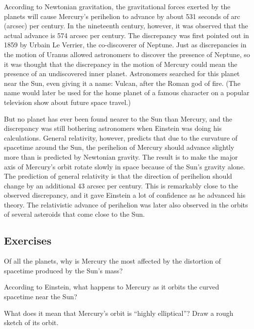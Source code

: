 \documentclass{article}
\numberwithin{equation}{section}
\numberwithin{figure}{section}
\begin{document}
According to Newtonian gravitation, the gravitational forces exerted by the planets will cause Mercury's perihelion to advance by about 531 seconds of arc (arcsec) per century. In the nineteenth century, however, it was observed that the actual advance is 574 arcsec per century. The discrepancy was first pointed out in 1859 by Urbain Le Verrier, the co-discoverer of Neptune. Just as discrepancies in the motion of Uranus allowed astronomers to discover the presence of Neptune, so it was thought that the discrepancy in the motion of Mercury could mean the presence of an undiscovered inner planet. Astronomers searched for this planet near the Sun, even giving it a name: Vulcan, after the Roman god of fire. (The name would later be used for the home planet of a famous character on a popular television show about future space travel.)
\vspace{1em}

But no planet has ever been found nearer to the Sun than Mercury, and the discrepancy was still bothering astronomers when Einstein was doing his calculations. General relativity, however, predicts that due to the curvature of spacetime around the Sun, the perihelion of Mercury should advance slightly more than is predicted by Newtonian gravity. The result is to make the major axis of Mercury's orbit rotate slowly in space because of the Sun's gravity alone. The prediction of general relativity is that the direction of perihelion should change by an additional 43 arcsec per century. This is remarkably close to the observed discrepancy, and it gave Einstein a lot of confidence as he advanced his theory. The relativistic advance of perihelion was later also observed in the orbits of several asteroids that come close to the Sun.

\subsection*{Exercises}

\begin{exercise}
    Of all the planets, why is Mercury the most affected by the distortion of spacetime produced by the Sun's mass?
\end{exercise}

\begin{exercise}
    According to Einstein, what happens to Mercury as it orbits the curved spacetime near the Sun?
\end{exercise}

\begin{exercise}
    What does it mean that Mercury's orbit is ``highly elliptical''? Draw a rough sketch of its orbit.
\end{exercise}
\end{document}
